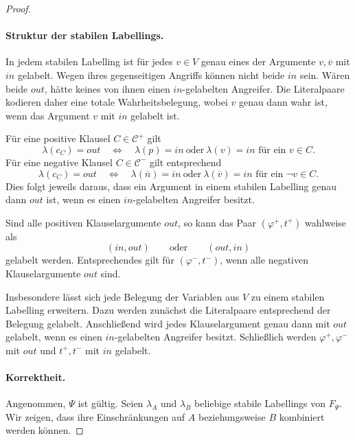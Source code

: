 \begin{proof}
\paragraph{Struktur der stabilen Labellings.}
In jedem stabilen Labelling ist für jedes \(v\in V\) genau eines der
Argumente \(v,\overline v\) mit \(\mathit{in}\) gelabelt. Wegen ihres
gegenseitigen Angriffs können nicht beide \(\mathit{in}\) sein. Wären
beide \(\mathit{out}\), hätte keines von ihnen einen
\(\mathit{in}\)-gelabelten Angreifer. Die Literalpaare kodieren daher
eine totale Wahrheitsbelegung, wobei \(v\) genau dann wahr ist, wenn das
Argument \(v\) mit \(\mathit{in}\) gelabelt ist.

Für eine positive Klausel \(C\in\mathcal C^+\) gilt
\[
    \lambda(c_C)=\mathit{out}
    \quad\Longleftrightarrow\quad
    \lambda(p)=\mathit{in}
    \ \text{oder}\
    \lambda(v)=\mathit{in}
    \text{ für ein }v\in C.
\]
Für eine negative Klausel \(C\in\mathcal C^-\) gilt entsprechend
\[
    \lambda(c_C)=\mathit{out}
    \quad\Longleftrightarrow\quad
    \lambda(\overline n)=\mathit{in}
    \ \text{oder}\
    \lambda(\overline v)=\mathit{in}
    \text{ für ein }\neg v\in C.
\]
Dies folgt jeweils daraus, dass ein Argument in einem stabilen Labelling
genau dann \(\mathit{out}\) ist, wenn es einen
\(\mathit{in}\)-gelabelten Angreifer besitzt.

Sind alle positiven Klauselargumente \(\mathit{out}\), so kann das Paar
\((\varphi^+,t^+)\) wahlweise als
\[
    (\mathit{in},\mathit{out})
    \qquad\text{oder}\qquad
    (\mathit{out},\mathit{in})
\]
gelabelt werden. Entsprechendes gilt für
\((\varphi^-,t^-)\), wenn alle negativen Klauselargumente
\(\mathit{out}\) sind.

Insbesondere lässt sich jede Belegung der Variablen aus \(V\) zu einem
stabilen Labelling erweitern. Dazu werden zunächst die Literalpaare
entsprechend der Belegung gelabelt. Anschließend wird jedes
Klauselargument genau dann mit \(\mathit{out}\) gelabelt, wenn es einen
\(\mathit{in}\)-gelabelten Angreifer besitzt. Schließlich werden
\(\varphi^+,\varphi^-\) mit \(\mathit{out}\) und
\(t^+,t^-\) mit \(\mathit{in}\) gelabelt.

\paragraph{Korrektheit.}
Angenommen, \(\Psi\) ist gültig. Seien
\(\lambda_A\) und \(\lambda_B\) beliebige stabile Labellings von
\(F_\Psi\). Wir zeigen, dass ihre Einschränkungen auf \(A\) beziehungsweise
\(B\) kombiniert werden können.


\end{proof}
